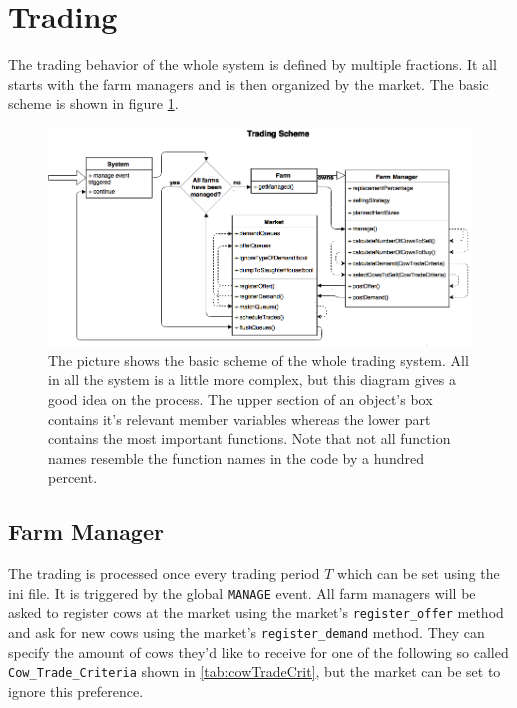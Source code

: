 \section{Trading}\label{chap:tradeDesc}
The trading behavior of the whole system is defined by multiple fractions. It all starts with the farm managers and is then organized by the market. The basic scheme is shown in figure \ref{fig:tradingScheme}.
\begin{figure}[htbp]
\centering
\noindent\includegraphics[width=0.8\linewidth,height=\textheight,
keepaspectratio]{MarketFlow.png} 
\caption[Trading Scheme]{The picture shows the basic scheme of the whole trading system. All in all the system is a little more complex, but this diagram gives a good idea on the process. The upper section of an object's box contains it's relevant member variables whereas the lower part contains the most important functions. Note that not all function names resemble the function names in the code by a hundred percent.}
\label{fig:tradingScheme}
\end{figure}
\subsection{Farm Manager}
The trading is processed once every trading period $T$ which can be set using the ini file. It is triggered by the global {\tt MANAGE} event. All farm managers will be asked to register cows at the market using the market's {\tt register\_offer} method and ask for new cows using the market's {\tt register\_demand} method. They can specify the amount of cows they'd like to receive for one of the following so called {\tt Cow\_Trade\_Criteria} shown in \ref{tab:cowTradeCrit}, but the market can be set to ignore this preference. 

